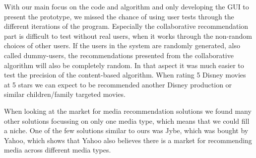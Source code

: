 With our main focus on the code and algorithm and only developing the GUI to present the prototype, we missed the chance of using user tests through the different iterations of the program. Especially the collaborative recommendation part is difficult to test without real users, when it works through the non-random choices of other users. If the users in the system are randomly generated, also called dummy-users, the recommendations presented from the collaborative algorithm will also be completely random. In that aspect it was much easier to test the precision of the content-based algorithm. When rating 5 Disney movies at 5 stars we can expect to be recommended another Disney production or similar children/family targeted movies.

When looking at the market for media recommendation solutions we found many other solutions focussing on only one media type, which means that we could fill a niche. One of the few solutions similar to ours was Jybe, which was bought by Yahoo, which shows that Yahoo also believes there is a market for recommending media across different media types. \cite{Jybe}